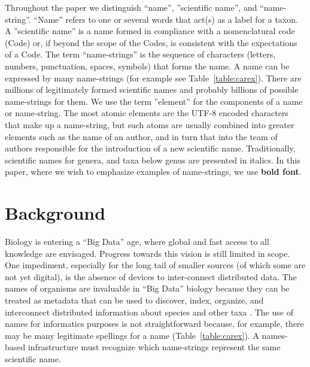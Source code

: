 \documentclass{bmcart}
\begin{document}
Throughout the paper we distinguish ``name'', ''scientific name'', and
``name-string''.  ``Name'' refers to one or several words that act(s) as a label
for a taxon. A ''scientific name'' is a name formed in compliance with a
nomenclatural code (Code) or, if beyond the scope of the Codes, is consistent
with the expectations of a Code.  The term ``name-strings'' is the sequence of
characters (letters, numbers, punctuation, spaces, symbols) that forms the
name.  A name can be expressed by many name-strings (for example see
Table~\ref{table:carex}).  There are millions of
legitimately formed scientific names and probably billions of possible
name-strings for them. We use the term ''element'' for the components of a name or name-string. The most atomic elements are the UTF-8 encoded characters that make up a name-string, but such atoms are usually combined into greater elements such as the name of an author, and in turn that into the team of authors responsible for the introduction of a new scientific name.  Traditionally, scientific names for genera, and taxa
below genus are presented in italics. In this paper, where we wish to emphasize examples of
name-strings, we use \textbf{bold font}.

\section*{Background}

Biology is entering a ``Big Data'' age, where global and fast access to all knowledge are envisaged. Progress towards this vision is still limited in scope. One impediment,
especially for the long tail of smaller sources (of which some are not yet
digital), is the absence of devices to inter-connect distributed data.  The names of
organisms are invaluable in ``Big Data'' biology because they can be treated as metadata that can be used to discover, index, organize, and interconnect distributed information about species and other taxa \cite{Patterson2010}.  The use of names for informatics purposes is not straightforward because, for example, there may be many legitimate spellings for a name (Table~\ref{table:carex}). A names-based infrastructure must recognize which name-strings  represent the same scientific name.
\end{document}
